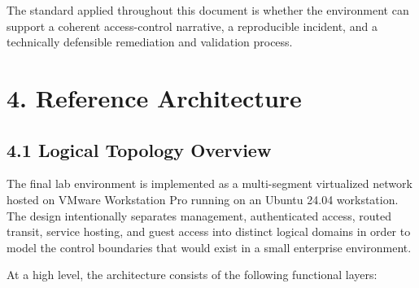 \documentclass[11pt]{article}
\begin{document}
The standard applied throughout this document is whether the environment can support a coherent access-control narrative, a reproducible incident, and a technically defensible remediation and validation process.


\section{4. Reference Architecture}
\label{sec:reference-architecture}


\subsection{4.1 Logical Topology Overview}
\label{sec:logical-topology-overview}

The final lab environment is implemented as a multi-segment virtualized network hosted on VMware Workstation Pro running on an Ubuntu 24.04 workstation. The design intentionally separates management, authenticated access, routed transit, service hosting, and guest access into distinct logical domains in order to model the control boundaries that would exist in a small enterprise environment.

At a high level, the architecture consists of the following functional layers:
\end{document}
